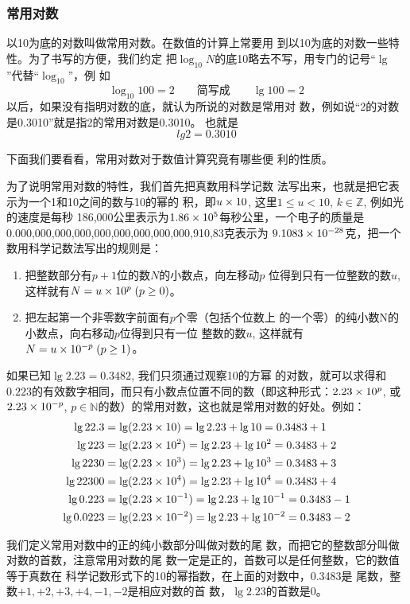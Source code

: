 \subsubsection{常用对数}
    以10为底的对数叫做常用对数。在数值的计算上常要用
    到以10为底的对数一些特性。为了书写的方便，我们约定
    把$\log_{10}N$的底10略去不写，用专门的记号“$\lg$”代替“$\log_{10}$”，例
    如
\[ \log_{10} 100=2 \qquad \text{简写成}\qquad  \lg100=2\]
    以后，如果没有指明对数的底，就认为所说的对数是常用对
    数，例如说“2的对数是0.3010”就是指2的常用对数是0.3010。
    也就是
 \[   lg2=0.3010\]
  
 下面我们要看看，常用对数对于数值计算究竟有哪些便
    利的性质。

为了说明常用对数的特性，我们首先把真数用科学记数
法写出来，也就是把它表示为一个1和10之间的数与10的幂的
积，即$u\times10$, 这里$1\le u<10$, $k\in\mathbb{Z}$, 例如光的速度是每秒
186,000公里表示为$1.86\times10^5$每秒公里，一个电子的质量是
0.000,000,000,000,000,000,000,000,000,910,83克表示为
$9.1083\times10^{-28}$克，把一个数用科学记数法写出的规则是：

\begin{enumerate}
    \item 把整数部分有$p+1$位的数$N$的小数点，向左移动$p$
    位得到只有一位整数的数$u$, 这样就有$N=u\times10^p\; (p\ge0)$。
    \item 把左起第一个非零数字前面有$p$个零（包括个位数上
    的一个零）的纯小数N的小数点，向右移动$p$位得到只有一位
    整数的数$u$, 这样就有$N=u\times10^{-p}\; (p\ge1)$。
\end{enumerate}

如果已知$\lg2.23=0.3482$, 我们只须通过观察10的方幂
    的对数，就可以求得和$0.223$的有效数字相同，而只有小数点位置不同的数（即这种形式：$2.23\times10^p$, 或$2.23\times10^{-p}$,
    $p\in\mathbb{N}$的数）的常用对数，这也就是常用对数的好处。例如：
\[\begin{split}
\lg22.3&=\lg(2.23\times 10)=\lg2.23+\lg 10=0.3483+1\\
\lg223&=\lg(2.23\times 10^2)=\lg2.23+\lg 10^2=0.3483+2\\
\lg2230&=\lg(2.23\times 10^3)=\lg2.23+\lg 10^3=0.3483+3\\
\lg22300&=\lg(2.23\times 10^4)=\lg2.23+\lg 10^4=0.3483+4\\
\lg0.223&=\lg(2.23\times 10^{-1})=\lg2.23+\lg 10^{-1}=0.3483-1\\
\lg0.0223&=\lg(2.23\times 10^{-2})=\lg2.23+\lg 10^{-2}=0.3483-2
\end{split}\]

我们定义常用对数中的正的纯小数部分叫做对数的尾
数，而把它的整数部分叫做对数的首数，注意常用对数的尾
数一定是正的，首数可以是任何整数，它的数值等于真数在
科学记数形式下的10的幂指数，在上面的对数中，0.3483是
尾数，整数$+1,+2,+3,+4,-1,-2$是相应对数的首
数，$\lg2.23$的首数是0。

